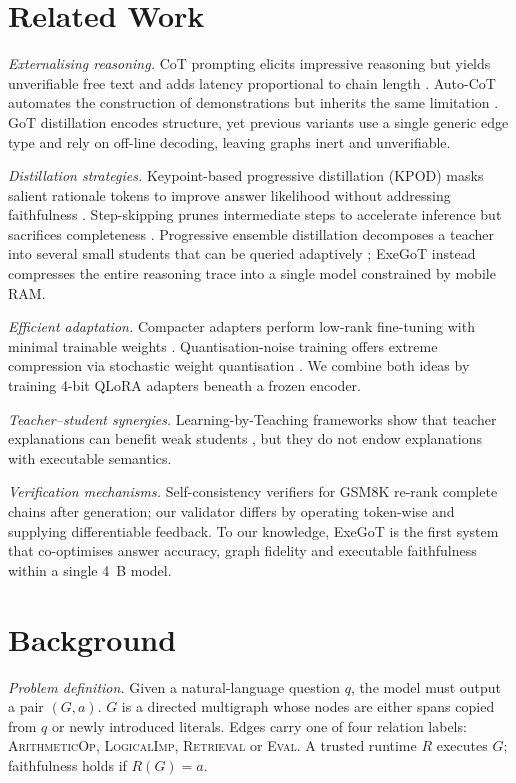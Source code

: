 \documentclass{article} %
\begin{document}
\section{Related Work}
\label{sec:related}
\textit{Externalising reasoning.} CoT prompting elicits impressive reasoning but yields unverifiable free text and adds latency proportional to chain length \cite{wei_2022-01-28T02:33:07Z_chain}. Auto-CoT automates the construction of demonstrations but inherits the same limitation \cite{zhang_2022-10-07T12:28:21Z_automatic}. GoT distillation encodes structure, yet previous variants use a single generic edge type and rely on off-line decoding, leaving graphs inert and unverifiable.

\textit{Distillation strategies.} Keypoint-based progressive distillation (KPOD) masks salient rationale tokens to improve answer likelihood without addressing faithfulness \cite{feng_2024-05-25T05:27:38Z_keypoint}. Step-skipping prunes intermediate steps to accelerate inference but sacrifices completeness \cite{liu_2024-11-04T07:10:24Z_can}. Progressive ensemble distillation decomposes a teacher into several small students that can be queried adaptively \cite{dennis_2023-02-20T16:57:44Z_progressive}; ExeGoT instead compresses the entire reasoning trace into a single model constrained by mobile RAM.

\textit{Efficient adaptation.} Compacter adapters perform low-rank fine-tuning with minimal trainable weights \cite{mahabadi_2021-06-08T19:17:04Z_compacter}. Quantisation-noise training offers extreme compression via stochastic weight quantisation \cite{fan_2020-04-15T20:10:53Z_training}. We combine both ideas by training 4-bit QLoRA adapters beneath a frozen encoder.

\textit{Teacher--student synergies.} Learning-by-Teaching frameworks show that teacher explanations can benefit weak students \cite{saha_2023-06-15T17:27:20Z_can,ning_2024-06-20T18:00:17Z_can}, but they do not endow explanations with executable semantics.

\textit{Verification mechanisms.} Self-consistency verifiers for GSM8K re-rank complete chains after generation; our validator differs by operating token-wise and supplying differentiable feedback. To our knowledge, ExeGoT is the first system that co-optimises answer accuracy, graph fidelity and executable faithfulness within a single 4~B model.

\section{Background}
\label{sec:background}
\textit{Problem definition.} Given a natural-language question $q$, the model must output a pair $(G, a)$. $G$ is a directed multigraph whose nodes are either spans copied from $q$ or newly introduced literals. Edges carry one of four relation labels: \textsc{ArithmeticOp}, \textsc{LogicalImp}, \textsc{Retrieval} or \textsc{Eval}. A trusted runtime $R$ executes $G$; faithfulness holds if $R(G)=a$.
\end{document}
